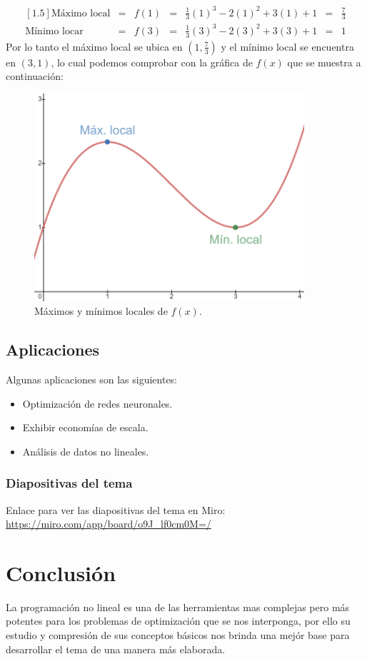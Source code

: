 \documentclass[letterpaper, 12pt]{article}
\begin{document}
    \[\begin{matrix}[1.5]
        \text{Máximo local}&=&f(1)&=&\frac{1}{3}(1)^3-2(1)^2+3(1)+1&=&\frac{7}{3}\\
        \text{Mínimo locar}&=&f(3)&=&\frac{1}{3}(3)^3-2(3)^2+3(3)+1&=&1
    \end{matrix}\]
    Por lo tanto el máximo local se ubica en \((1,\frac{7}{3})\) y el mínimo local se encuentra en \((3,1)\), lo cual podemos comprobar con la gráfica de \(f(x)\) que se muestra a continuación:
    \begin{figure}[H]
        \centering
        \includegraphics[width=10cm]{fxmaxmin.PNG}
        \caption{Máximos y mínimos locales de \(f(x)\).}
    \end{figure}
    \subsection{Aplicaciones}
    Algunas aplicaciones son las siguientes:
    \begin{itemize}
        \item Optimización de redes neuronales.
        \item Exhibir economías de escala.
        \item Análisis de datos no lineales.
    \end{itemize}
    \subsubsection*{Diapositivas del tema}
    Enlace para ver las diapositivas del tema en Miro: \url{https://miro.com/app/board/o9J_lf0cm0M=/}

    \section{Conclusión}
    La programación no lineal es una de las herramientas mas complejas pero más potentes para los problemas de optimización que se nos interponga, por ello su estudio y compresión
    de sus conceptos básicos nos brinda una mejór base para desarrollar el tema de una manera más elaborada.
\end{document}
